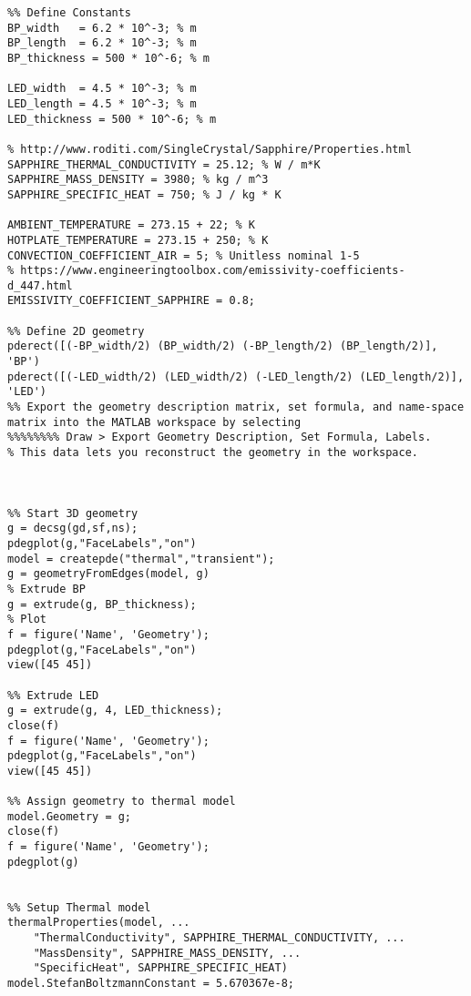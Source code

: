 
\begin{lstlisting}
%% Define Constants
BP_width   = 6.2 * 10^-3; % m
BP_length  = 6.2 * 10^-3; % m
BP_thickness = 500 * 10^-6; % m

LED_width  = 4.5 * 10^-3; % m
LED_length = 4.5 * 10^-3; % m
LED_thickness = 500 * 10^-6; % m

% http://www.roditi.com/SingleCrystal/Sapphire/Properties.html
SAPPHIRE_THERMAL_CONDUCTIVITY = 25.12; % W / m*K
SAPPHIRE_MASS_DENSITY = 3980; % kg / m^3
SAPPHIRE_SPECIFIC_HEAT = 750; % J / kg * K

AMBIENT_TEMPERATURE = 273.15 + 22; % K
HOTPLATE_TEMPERATURE = 273.15 + 250; % K
CONVECTION_COEFFICIENT_AIR = 5; % Unitless nominal 1-5 
% https://www.engineeringtoolbox.com/emissivity-coefficients-d_447.html
EMISSIVITY_COEFFICIENT_SAPPHIRE = 0.8;

%% Define 2D geometry
pderect([(-BP_width/2) (BP_width/2) (-BP_length/2) (BP_length/2)], 'BP')
pderect([(-LED_width/2) (LED_width/2) (-LED_length/2) (LED_length/2)], 'LED')
%% Export the geometry description matrix, set formula, and name-space matrix into the MATLAB workspace by selecting 
%%%%%%%% Draw > Export Geometry Description, Set Formula, Labels. 
% This data lets you reconstruct the geometry in the workspace.



%% Start 3D geometry
g = decsg(gd,sf,ns);
pdegplot(g,"FaceLabels","on")
model = createpde("thermal","transient");
g = geometryFromEdges(model, g)
% Extrude BP
g = extrude(g, BP_thickness);
% Plot
f = figure('Name', 'Geometry');
pdegplot(g,"FaceLabels","on")
view([45 45])

%% Extrude LED
g = extrude(g, 4, LED_thickness);
close(f)
f = figure('Name', 'Geometry');
pdegplot(g,"FaceLabels","on")
view([45 45])

%% Assign geometry to thermal model
model.Geometry = g;
close(f)
f = figure('Name', 'Geometry');
pdegplot(g)


%% Setup Thermal model
thermalProperties(model, ...
    "ThermalConductivity", SAPPHIRE_THERMAL_CONDUCTIVITY, ...
    "MassDensity", SAPPHIRE_MASS_DENSITY, ...
    "SpecificHeat", SAPPHIRE_SPECIFIC_HEAT)
model.StefanBoltzmannConstant = 5.670367e-8;


\end{lstlisting}
